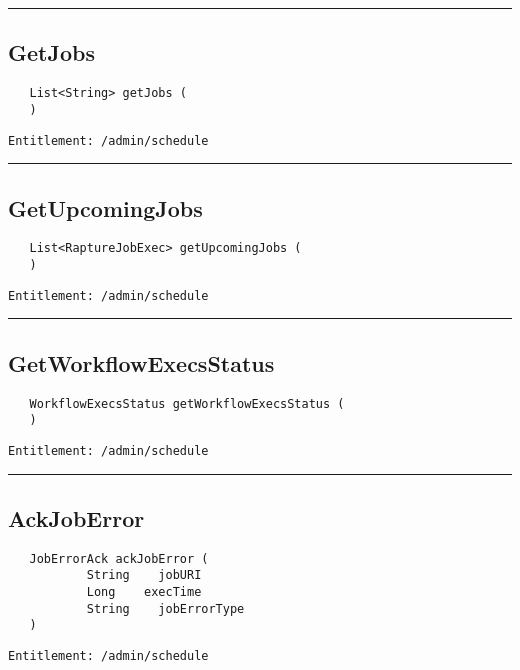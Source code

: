 \rule{12cm}{2pt}
\subsection{GetJobs}
\label{Api:GetJobs}
\begin{Verbatim}
   List<String> getJobs (
   )
\end{Verbatim}
\begin{Verbatim}[formatcom=\color{Maroon}]
  Entitlement: /admin/schedule
\end{Verbatim}



\rule{12cm}{2pt}
\subsection{GetUpcomingJobs}
\label{Api:GetUpcomingJobs}
\begin{Verbatim}
   List<RaptureJobExec> getUpcomingJobs (
   )
\end{Verbatim}
\begin{Verbatim}[formatcom=\color{Maroon}]
  Entitlement: /admin/schedule
\end{Verbatim}



\rule{12cm}{2pt}
\subsection{GetWorkflowExecsStatus}
\label{Api:GetWorkflowExecsStatus}
\begin{Verbatim}
   WorkflowExecsStatus getWorkflowExecsStatus (
   )
\end{Verbatim}
\begin{Verbatim}[formatcom=\color{Maroon}]
  Entitlement: /admin/schedule
\end{Verbatim}



\rule{12cm}{2pt}
\subsection{AckJobError}
\label{Api:AckJobError}
\begin{Verbatim}
   JobErrorAck ackJobError (
           String    jobURI
           Long    execTime
           String    jobErrorType
   )
\end{Verbatim}
\begin{Verbatim}[formatcom=\color{Maroon}]
  Entitlement: /admin/schedule
\end{Verbatim}



